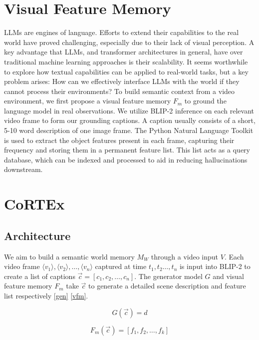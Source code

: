 \documentclass[conference]{IEEEtran}
\begin{document}
\section{Visual Feature Memory}

LLMs are engines of language. Efforts to extend their capabilities to the real world have proved challenging, especially due to their lack of visual perception. A key advantage that LLMs, and transformer architectures in general, have over traditional machine learning approaches is their scalability. It seems worthwhile to explore how textual capabilities can be applied to real-world tasks, but a key problem arises: How can we effectively interface LLMs with the world if they cannot process their environments? To build semantic context from a video environment, we first propose a visual feature memory $F_m$ to ground the language model in real observations. We utilize BLIP-2 inference on each relevant video frame to form our grounding captions. A caption usually consists of a short, 5-10 word description of one image frame. The Python Natural Language Toolkit is used to extract the object features present in each frame, capturing their frequency and storing them in a permanent feature list. This list acts as a query database, which can be indexed and processed to aid in reducing hallucinations downstream.

\section{CoRTEx}

\subsection{Architecture}

We aim to build a semantic world memory $M_W$ through a video input $V$. Each video frame $\langle v_{1}\rangle,\langle v_{2}\rangle,\dots,\langle v_{n}\rangle$ captured at time $t_{1},t_{2}\dots,t_{n}$ is input into BLIP-2 to create a list of captions $\vec c=[c_{1},c_{2},\dots,c_{n}]$. The generator model $G$ and visual feature memory $F_m$ take $\vec c$ to generate a detailed scene description and feature list respectively \ref{gen} \ref{vfm}.

\begin{equation} \label{gen}
G(\vec c)=d
\end{equation}

\begin{equation} \label{vfm}
F_m(\vec c)=[f_{1},f_{2},\dots, f_{k}]
\end{equation}
\end{document}

